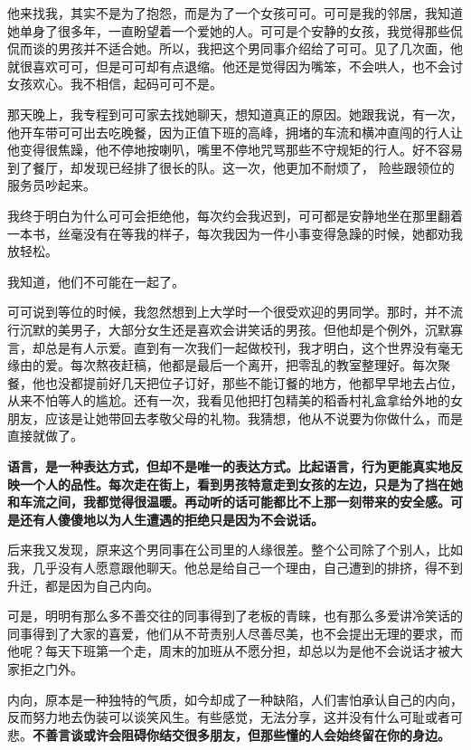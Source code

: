 \documentclass[UTF8,a4paper,8pt]{ctexart}
\begin{document}
 他来找我，其实不是为了抱怨，而是为了一个女孩可可。可可是我的邻居，我知道她单身了很多年，一直盼望着一个爱她的人。可可是个安静的女孩，我觉得那些侃侃而谈的男孩并不适合她。所以，我把这个男同事介绍给了可可。见了几次面，他就很喜欢可可，但是可可却有点退缩。他还是觉得因为嘴笨，不会哄人，也不会讨女孩欢心。我不相信，起码可可不是。
 
 那天晚上，我专程到可可家去找她聊天，想知道真正的原因。她跟我说，有一次，他开车带可可出去吃晚餐，因为正值下班的高峰，拥堵的车流和横冲直闯的行人让他变得很焦躁，他不停地按喇叭，嘴里不停地咒骂那些不守规矩的行人。好不容易到了餐厅，却发现已经排了很长的队。这一次，他更加不耐烦了， 险些跟领位的服务员吵起来。
 
 我终于明白为什么可可会拒绝他，每次约会我迟到，可可都是安静地坐在那里翻着一本书，丝毫没有在等我的样子，每次我因为一件小事变得急躁的时候，她都劝我放轻松。
 
 我知道，他们不可能在一起了。
 
 可可说到等位的时候，我忽然想到上大学时一个很受欢迎的男同学。那时，并不流行沉默的美男子，大部分女生还是喜欢会讲笑话的男孩。但他却是个例外，沉默寡言，却总是有人示爱。直到有一次我们一起做校刊，我才明白，这个世界没有毫无缘由的爱。每次熬夜赶稿，他都是最后一个离开，把零乱的教室整理好。每次聚餐，他也没都提前好几天把位子订好，那些不能订餐的地方，他都早早地去占位，从来不怕等人的尴尬。还有一次，我看见他把打包精美的稻香村礼盒拿给外地的女朋友，应该是让她带回去孝敬父母的礼物。我猜想，他从不说要为你做什么，而是直接就做了。
 
 \textbf{语言，是一种表达方式，但却不是唯一的表达方式。比起语言，行为更能真实地反映一个人的品性。每次走在街上，看到男孩特意走到女孩的左边，只是为了挡在她和车流之间，我都觉得很温暖。再动听的话可能都比不上那一刻带来的安全感。可是还有人傻傻地以为人生遭遇的拒绝只是因为不会说话。}
 
 后来我又发现，原来这个男同事在公司里的人缘很差。整个公司除了个别人，比如我，几乎没有人愿意跟他聊天。他总是给自己一个理由，自己遭到的排挤，得不到升迁，都是因为自己内向。
 
 可是，明明有那么多不善交往的同事得到了老板的青睐，也有那么多爱讲冷笑话的同事得到了大家的喜爱，他们从不苛责别人尽善尽美，也不会提出无理的要求，而他呢？每天下班第一个走，周末的加班从不愿分担，却总以为是他不会说话才被大家拒之门外。
 
 内向，原本是一种独特的气质，如今却成了一种缺陷，人们害怕承认自己的内向，反而努力地去伪装可以谈笑风生。有些感觉，无法分享，这并没有什么可耻或者可悲。\textbf{不善言谈或许会阻碍你结交很多朋友，但那些懂的人会始终留在你的身边。}
 
\end{document}
